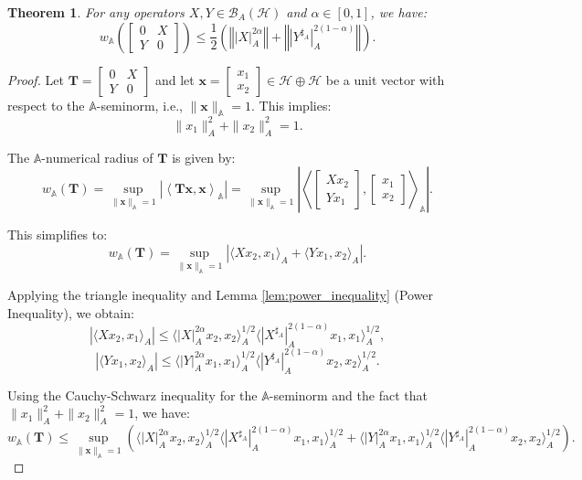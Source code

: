 \documentclass{article}
\newcommand{\norm}[1]{\left\Vert#1\right\Vert}
\newtheorem{theorem}{Theorem}[section]
\begin{document}
\begin{theorem}\label{thm2.7}
\label{thm:main}
For any operators $X, Y \in \mathcal{B}_A(\mathcal{H})$ and $\alpha \in [0, 1]$, we have:
\[
w_{\mathbb{A}}\left(\begin{bmatrix} 0 & X \\ Y & 0 \end{bmatrix}\right) \leq \frac{1}{2}\left(\norm{|X|_A^{2\alpha}} + \norm{|Y^{\sharp_A}|_A^{2(1-\alpha)}}\right).
\]
\end{theorem}
\begin{proof}
Let $\mathbf{T} = \begin{bmatrix} 0 & X \\ Y & 0 \end{bmatrix}$ and let $\mathbf{x} = \begin{bmatrix} x_1 \\ x_2 \end{bmatrix} \in \mathcal{H} \oplus \mathcal{H}$ be a unit vector with respect to the $\mathbb{A}$-seminorm, i.e., $\|\mathbf{x}\|_{\mathbb{A}} = 1$. This implies:
\[
\|x_1\|_A^2 + \|x_2\|_A^2 = 1.
\]

The $\mathbb{A}$-numerical radius of $\mathbf{T}$ is given by:
\[
w_{\mathbb{A}}(\mathbf{T}) = \sup_{\|\mathbf{x}\|_{\mathbb{A}}=1} \left| \left\langle \mathbf{T}\mathbf{x}, \mathbf{x} \right\rangle_{\mathbb{A}} \right| = \sup_{\|\mathbf{x}\|_{\mathbb{A}}=1} \left| \left\langle \begin{bmatrix} Xx_2 \\ Yx_1 \end{bmatrix}, \begin{bmatrix} x_1 \\ x_2 \end{bmatrix} \right\rangle_{\mathbb{A}} \right|.
\]

This simplifies to:
\[
w_{\mathbb{A}}(\mathbf{T}) = \sup_{\|\mathbf{x}\|_{\mathbb{A}}=1} \left| \langle Xx_2, x_1 \rangle_A + \langle Yx_1, x_2 \rangle_A \right|.
\]

Applying the triangle inequality and Lemma \ref{lem:power_inequality} (Power Inequality), we obtain:
\[
\left| \langle Xx_2, x_1 \rangle_A \right| \leq \langle |X|_A^{2\alpha}x_2, x_2 \rangle_A^{1/2} \langle |X^{\sharp_A}|_A^{2(1-\alpha)}x_1, x_1 \rangle_A^{1/2},
\]
\[
\left| \langle Yx_1, x_2 \rangle_A \right| \leq \langle |Y|_A^{2\alpha}x_1, x_1 \rangle_A^{1/2} \langle |Y^{\sharp_A}|_A^{2(1-\alpha)}x_2, x_2 \rangle_A^{1/2}.
\]

Using the Cauchy-Schwarz inequality for the $\mathbb{A}$-seminorm and the fact that $\|x_1\|_A^2 + \|x_2\|_A^2 = 1$, we have:
\[
w_{\mathbb{A}}(\mathbf{T}) \leq \sup_{\|\mathbf{x}\|_{\mathbb{A}}=1} \left( \langle |X|_A^{2\alpha}x_2, x_2 \rangle_A^{1/2} \langle |X^{\sharp_A}|_A^{2(1-\alpha)}x_1, x_1 \rangle_A^{1/2} + \langle |Y|_A^{2\alpha}x_1, x_1 \rangle_A^{1/2} \langle |Y^{\sharp_A}|_A^{2(1-\alpha)}x_2, x_2 \rangle_A^{1/2} \right).
\]


\end{proof}
\end{document}
